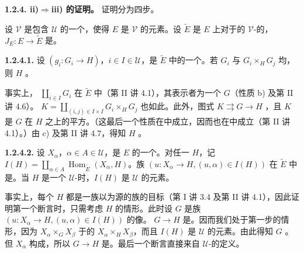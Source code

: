 \textbf{1.2.4. ii)$\Rightarrow$iii) 的证明。} 证明分为四步。

设 $\mathcal V$ 是包含 $\mathcal U$ 的一个，使得 $E$ 是 $\mathcal V$ 的元素。设 $\widetilde E$ 是 $E$ 上对于的 $\mathcal V$-的，$J_E:E\to\widetilde E$ 是。

\textbf{1.2.4.1.} 设 $(g_i:G_i\to H)$，$i\in I\in\mathcal U$，是 $\widetilde E$ 中的一个。若 $G_i$ 与 $G_i\times_H G_j$ 均，则 $H$ 。

事实上， $\coprod_{i\in I}G_i$ 在 $\widetilde E$ 中（第 II 讲 4.1），其表示者为一个 $G$（性质 b) 及第 II 讲 4.6）。 $K=\coprod_{(i,j)\in I\times I}G_i\times_H G_j$ 也如此。此外，图式 $K\rightrightarrows G\to H$ ，且 $K$ 是 $G$ 在 $H$ 之上的平方。（这最后一个性质在中成立，因而也在中成立（第 II 讲 4.1）。）由 c) 及第 II 讲 4.7，得知 $H$ 。

\textbf{1.2.4.2.} 设 $X_\alpha$，$\alpha\in A\in\mathcal U$，是 $E$ 的一个。对任一 $H$，记 $I(H)=\coprod_{\alpha\in A}\operatorname{Hom}_{\widetilde E}(X_\alpha,H)$。族 $(u:X_\alpha\to H,(u,\alpha)\in I(H))$ 在 $\widetilde E$ 中是。当 $H$ 是一个 $\mathcal U$-时，$I(H)$ 是 $\mathcal U$ 的元素。

事实上，每个 $H$ 都是一族以为源的族的目标（第 I 讲 3.4 及第 II 讲 4.1），因此证明第一个断言时，只需考虑 $H$ 的情形。此时设 $G$ 是族 $(u:X_\alpha\to H,(u,\alpha)\in I(H))$ 的像。 $G\to H$ 是。因而我们处于第一步的情形，因为 $X_\alpha\times_G X_\beta$ 于的 $X_\alpha\times_H X_\beta$，而且 $I(H)$ 是 $\mathcal U$ 的元素。由此得知 $G$ 。但 $X_\alpha$ 构成，所以 $G\to H$ 是。最后一个断言直接来自 $\mathcal U$-的定义。

